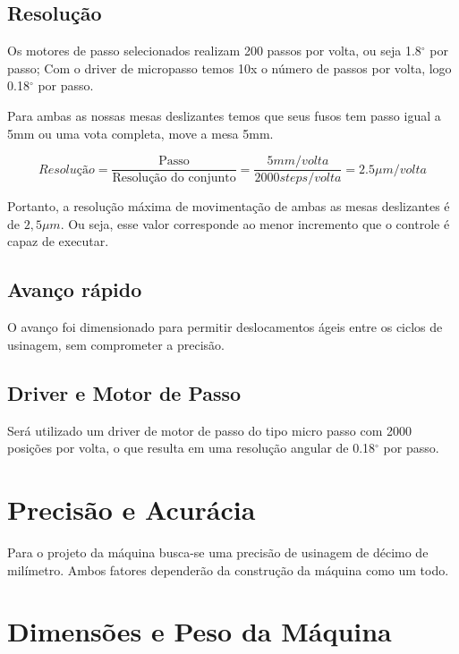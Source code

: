\subsection{Resolução}
Os motores de passo selecionados realizam 200 passos por volta, ou seja 1.8$^{\circ}$ por passo; Com o driver de micropasso temos 10x o número de passos por volta, logo 0.18$^{\circ}$ por passo.

Para ambas as nossas mesas deslizantes temos que seus fusos tem passo igual a 5mm ou uma vota completa, move a mesa 5mm.

\begin{equation}
   Resolução = \frac{\text{Passo}}{\text{Resolução do conjunto}} = \frac{5 mm/volta}{2000 steps/volta} = 2.5 \mu m /volta
\end{equation}

Portanto, a resolução máxima de movimentação de ambas as mesas deslizantes é de $2,5 \mu m$. Ou seja, esse valor corresponde ao menor incremento que o controle é capaz de executar.  

\subsection{Avanço rápido}

O avanço foi dimensionado para permitir deslocamentos ágeis entre os ciclos de usinagem, sem comprometer a precisão.

\subsection{Driver e Motor de Passo}
Será utilizado um driver de motor de passo do tipo micro passo com 2000 posições por volta, o que resulta em uma resolução angular de 0.18$^{\circ}$ por passo.
\section{Precisão e Acurácia}

Para o projeto da máquina busca-se uma precisão de usinagem de décimo de milímetro. Ambos fatores dependerão da construção da máquina como um todo. 

\section{Dimensões e Peso da Máquina}

